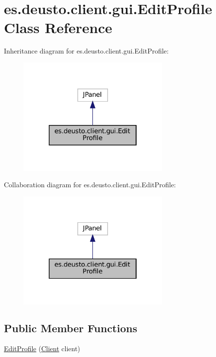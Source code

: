 \hypertarget{classes_1_1deusto_1_1client_1_1gui_1_1_edit_profile}{}\section{es.\+deusto.\+client.\+gui.\+Edit\+Profile Class Reference}
\label{classes_1_1deusto_1_1client_1_1gui_1_1_edit_profile}


Inheritance diagram for es.\+deusto.\+client.\+gui.\+Edit\+Profile\+:
\nopagebreak
\begin{figure}[H]
\begin{center}
\leavevmode
\includegraphics[width=214pt]{classes_1_1deusto_1_1client_1_1gui_1_1_edit_profile__inherit__graph}
\end{center}
\end{figure}


Collaboration diagram for es.\+deusto.\+client.\+gui.\+Edit\+Profile\+:
\nopagebreak
\begin{figure}[H]
\begin{center}
\leavevmode
\includegraphics[width=214pt]{classes_1_1deusto_1_1client_1_1gui_1_1_edit_profile__coll__graph}
\end{center}
\end{figure}
\subsection*{Public Member Functions}
\begin{DoxyCompactItemize}
\item 
\mbox{\hyperlink{classes_1_1deusto_1_1client_1_1gui_1_1_edit_profile_a0302d5f1a2df66b4e4ce357ec32015bd}{Edit\+Profile}} (\mbox{\hyperlink{classes_1_1deusto_1_1client_1_1_client}{Client}} client)
\end{DoxyCompactItemize}


